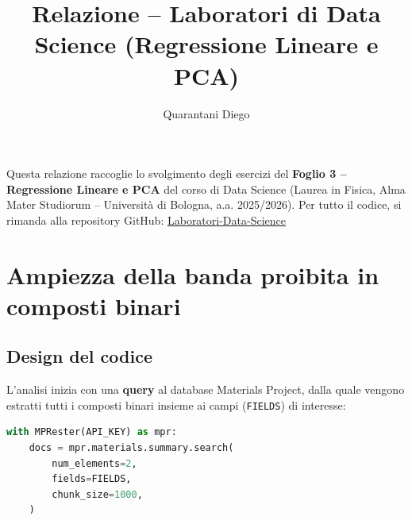 \documentclass[a4paper,11pt]{article}
\title{Relazione – Laboratori di Data Science (Regressione Lineare e PCA)}
\author{Quarantani Diego}
\date{\DTMtoday}
\begin{document}


\lstset{style=mystyle}




\maketitle

Questa relazione raccoglie lo svolgimento degli esercizi del \textbf{Foglio 3 – Regressione Lineare e PCA} del corso di Data Science (Laurea in Fisica, Alma Mater Studiorum – Università di Bologna, a.a. 2025/2026).
Per tutto il codice, si rimanda alla repository GitHub: \href{https://github.com/CetrioloRiick/Laboratori-Data-Science.git}{Laboratori-Data-Science}

\section{Ampiezza della banda proibita in composti binari}
\subsection{Design del codice}

L’analisi inizia con una \textbf{query} al database Materials Project, dalla quale vengono estratti tutti i composti binari insieme ai campi (\texttt{FIELDS}) di interesse:

\begin{lstlisting}[language=Python]
with MPRester(API_KEY) as mpr:
    docs = mpr.materials.summary.search(
        num_elements=2,
        fields=FIELDS,
        chunk_size=1000,
    )
\end{lstlisting}
\end{document}
